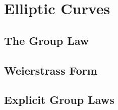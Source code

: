 \documentclass[../notes.tex]{subfiles}
\begin{document}
\section{Elliptic Curves}

\subsection{The Group Law}

\subsection{Weierstrass Form}

\subsection{Explicit Group Laws}
\end{document}
